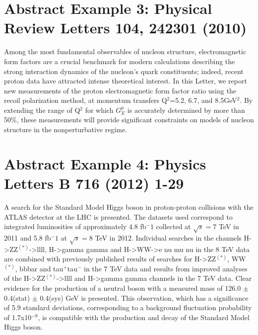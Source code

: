 \documentclass{article}
\begin{document}
\section{Abstract Example 3: Physical Review Letters 104, 242301 (2010)}
Among the most fundamental observables of nucleon structure, electromagnetic
form factors are a crucial benchmark for modern calculations describing the
strong interaction dynamics of the nucleon's quark constituents; indeed,
recent proton data have attracted intense theoretical interest. In this
Letter, we report new measurements of the proton electromagnetic form factor
ratio using the recoil polarization method, at momentum transfers 
Q$^2$=5.2, 6.7, and 8.5GeV$^2$. By extending the range of Q$^2$ for which
$G_E^p$ is accurately determined by more than 50\%, these measurements will
provide significant constraints on models of nucleon structure in the
nonperturbative regime.

\section{Abstract Example 4: Physics Letters B 716 (2012) 1-29}
A search for the Standard Model Higgs boson in proton-proton collisions
with the ATLAS detector at the LHC is presented. The datasets used correspond
to integrated luminosities of approximately 4.8 fb$^-1$ collected at
$\sqrt{s} = 7$ TeV in 2011 and 5.8 fb$^-1$ at $\sqrt{s} = 8$ TeV in 2012.
Individual searches in the channels H->ZZ$^(*)$->llll, H->gamma gamma and
H->WW->e nu mu nu in the 8 TeV data are combined with previously published
results of searches for H->ZZ$^(*)$, WW$^(*)$, bbbar and tau$^+$tau$^-$ in
the 7 TeV data and results from improved analyses of the H->ZZ$^(*)$->llll
and H->gamma gamma channels in the 7 TeV data. Clear evidence for the
production of a neutral boson with a measured mass of 126.0 $\pm$ 0.4(stat)
$\pm$ 0.4(sys) GeV is presented. This observation, which has a significance
of 5.9 standard deviations, corresponding to a background fluctuation
probability of 1.7x10$^{-9}$, is compatible with the production and decay
of the Standard Model Higgs boson.
\end{document}
